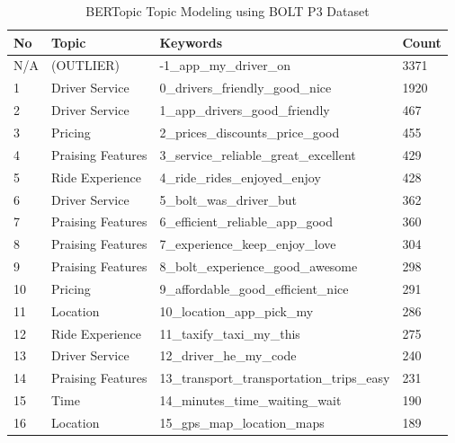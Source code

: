 \documentclass[12pt]{article}
\begin{document}
\begin{table}[!h]
\caption{BERTopic Topic Modeling using BOLT P3 Dataset}
\centering
\begin{tabular}{llll}
\hline
\textbf{No} & \textbf{Topic}    & \textbf{Keywords}                          & \textbf{Count}  \\
\hline
N/A         & (OUTLIER)         & -1\_app\_my\_driver\_on                    & 3371            \\
1           & Driver Service    & 0\_drivers\_friendly\_good\_nice           & 1920            \\
2           & Driver Service    & 1\_app\_drivers\_good\_friendly            & 467             \\
3           & Pricing           & 2\_prices\_discounts\_price\_good          & 455             \\
4           & Praising Features & 3\_service\_reliable\_great\_excellent     & 429             \\
5           & Ride Experience   & 4\_ride\_rides\_enjoyed\_enjoy             & 428             \\
6           & Driver Service    & 5\_bolt\_was\_driver\_but                  & 362             \\
7           & Praising Features & 6\_efficient\_reliable\_app\_good          & 360             \\
8           & Praising Features & 7\_experience\_keep\_enjoy\_love           & 304             \\
9           & Praising Features & 8\_bolt\_experience\_good\_awesome         & 298             \\
10          & Pricing           & 9\_affordable\_good\_efficient\_nice       & 291             \\
11          & Location          & 10\_location\_app\_pick\_my                & 286             \\
12          & Ride Experience   & 11\_taxify\_taxi\_my\_this                 & 275             \\
13          & Driver Service    & 12\_driver\_he\_my\_code                   & 240             \\
14          & Praising Features & 13\_transport\_transportation\_trips\_easy & 231             \\
15          & Time              & 14\_minutes\_time\_waiting\_wait           & 190             \\
16          & Location          & 15\_gps\_map\_location\_maps               & 189             \\

\end{tabular}
\end{table}
\end{document}
